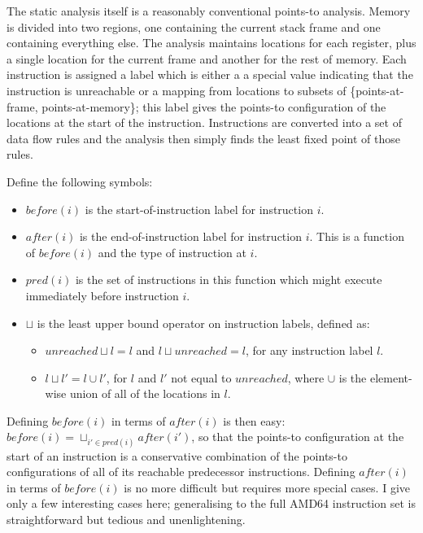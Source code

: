 The static analysis itself is a reasonably conventional points-to
analysis.  Memory is divided into two regions, one containing the
current stack frame and one containing everything else.  The analysis
maintains locations for each register, plus a single location for the
current frame and another for the rest of memory.  Each instruction is
assigned a label which is either a a special value indicating that the
instruction is unreachable or a mapping from locations to subsets of
\{points-at-frame, points-at-memory\}; this label gives the points-to
configuration of the locations at the start of the instruction.
Instructions are converted into a set of data flow rules and the
analysis then simply finds the least fixed point of those rules.

Define the following symbols:

\begin{itemize}
\item $before(i)$ is the start-of-instruction label for instruction
  $i$.
\item $after(i)$ is the end-of-instruction label for instruction $i$.
  This is a function of $before(i)$ and the type of instruction at
  $i$.
\item $pred(i)$ is the set of instructions in this function which
  might execute immediately before instruction $i$.
\item $\sqcup$ is the least upper bound operator on instruction
  labels, defined as:

  \begin{itemize}
  \item $unreached {\sqcup} l = l$ and $l {\sqcup} unreached = l$, for
    any instruction label $l$.
  \item $l {\sqcup} l' = l \cup l'$, for $l$ and $l'$ not equal to
    $unreached$, where $\cup$ is the element-wise union of all of the
    locations in $l$.
  \end{itemize}
\end{itemize}

Defining $before(i)$ in terms of $after(i)$ is then easy: $before(i) =
\sqcup_{i' \in pred(i)}after(i')$, so that the points-to configuration
at the start of an instruction is a conservative combination of the
points-to configurations of all of its reachable predecessor
instructions.  Defining $after(i)$ in terms of $before(i)$ is no more
difficult but requires more special cases.  I give only a few
interesting cases here; generalising to the full AMD64 instruction set
is straightforward but tedious and unenlightening.

